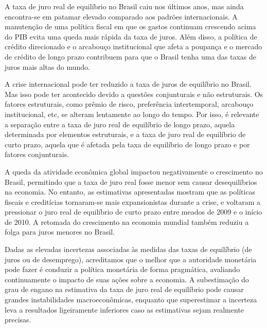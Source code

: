 A taxa de juro real de equilíbrio no Brasil caiu nos últimos anos, mas ainda encontra-se em patamar elevado comparado aos padrões internacionais. A manutenção de uma política fiscal em que os gastos continuam crescendo acima do PIB evita uma queda mais rápida da taxa de juros. Além disso, a política de crédito direcionado e o arcabouço institucional que afeta a poupança e o mercado de crédito de longo prazo contribuem para que o Brasil tenha uma das taxas de juros mais altas do mundo.

A crise internacional pode ter reduzido a taxa de juros de equilíbrio no Brasil. Mas isso pode ter acontecido devido a questões conjunturais e não estruturais. Os fatores estruturais, como prêmio de risco, preferência intertemporal, arcabouço
institucional, etc, se alteram lentamente ao longo do tempo. Por isso, é relevante a separação entre a taxa de juro real de equilíbrio de longo prazo, aquela determinada por elementos estruturais, e a taxa de juro real de equilíbrio de curto prazo, aquela que é afetada pela taxa de equilíbrio de longo prazo e por fatores conjunturais. 

A queda da atividade econômica global impactou negativamente o
crescimento no Brasil, permitindo que a taxa de juro real fosse menor sem causar desequilíbrios na economia. No entanto, as estimativas apresentadas mostram que as políticas fiscais e creditícias tornaram-se mais expansionistas durante a crise, e voltaram a pressionar o juro real de equilíbrio de curto prazo entre meados de 2009 e o início de 2010. A retomada do crescimento na economia mundial também reduziu a folga para juros menores no Brasil.

Dadas as elevadas incertezas associadas às medidas das taxas de equilíbrio (de juros ou de desemprego), acreditamos que o melhor que a autoridade monetária pode fazer é conduzir a política monetária de forma pragmática, avaliando continuamente o impacto de suas ações sobre a economia. A subestimação do grau de engano na estimativa da taxa de juro real de equilíbrio pode causar grandes instabilidades macroeconômicas, enquanto que superestimar a incerteza leva a resultados ligeiramente inferiores caso as estimativas sejam realmente precisas.
%
%
